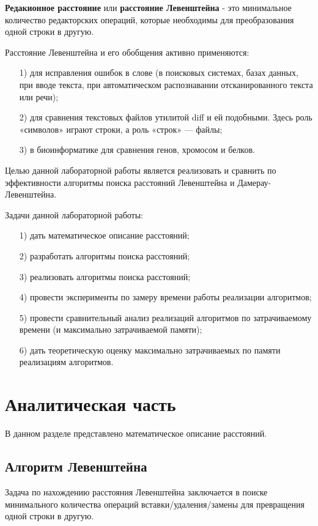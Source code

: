 \documentclass[12pt]{report}
\begin{document}
	\textbf{Редакионное расстояние} или \textbf{расстояние Левенштейна} - это минимальное количество редакторских операций, которые необходимы для преобразования одной строки в другую.
	
	Расстояние Левенштейна и его обобщения активно применяются: 
	\begin{enumerate}
		\item[1)] для исправления ошибок в слове (в поисковых системах, базах данных, при вводе текста, при автоматическом распознавании отсканированного текста или речи);
		\item[2)] для сравнения текстовых файлов утилитой diff и ей подобными. Здесь роль «символов» играют строки, а роль «строк» — файлы;
		\item[3)] в биоинформатике для сравнения генов, хромосом и белков.
	\end{enumerate}
	
	Целью данной лабораторной работы является реализовать и сравнить по эффективности алгоритмы поиска расстояний Левенштейна и Дамерау-Левенштейна.
	
	Задачи данной лабораторной работы:
	\begin{enumerate}
		\item[1)] дать математическое описание расстояний;
		\item[2)] разработать алгоритмы поиска расстояний;
		\item[3)] реализовать алгоритмы поиска расстояний;
		\item[4)] провести эксперименты по замеру времени работы реализации алгоритмов;
		\item[5)] провести сравнительный анализ реализаций алгоритмов по затрачиваемому времени (и максимально затрачиваемой памяти);
		\item[6)] дать теоретическую оценку максимально затрачиваемых по памяти реализациям алгоритмов.
	\end{enumerate}
	
	\chapter{Аналитическая часть} 
	В данном разделе представлено математическое описание расстояний.
	\section{Алгоритм Левенштейна}
	Задача по нахождению расстояния Левенштейна заключается в поиске минимального количества операций вставки/удаления/замены для превращения одной строки в другую.
	
\end{document}
